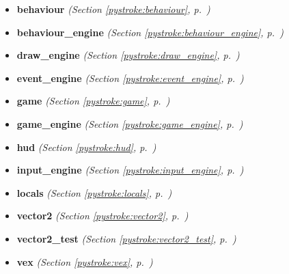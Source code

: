 \begin{itemize}
\setlength{\parskip}{0ex}
\item \textbf{behaviour}
  \textit{(Section \ref{pystroke:behaviour}, p.~\pageref{pystroke:behaviour})}

\item \textbf{behaviour\_engine}
  \textit{(Section \ref{pystroke:behaviour_engine}, p.~\pageref{pystroke:behaviour_engine})}

\item \textbf{draw\_engine}
  \textit{(Section \ref{pystroke:draw_engine}, p.~\pageref{pystroke:draw_engine})}

\item \textbf{event\_engine}
  \textit{(Section \ref{pystroke:event_engine}, p.~\pageref{pystroke:event_engine})}

\item \textbf{game}
  \textit{(Section \ref{pystroke:game}, p.~\pageref{pystroke:game})}

\item \textbf{game\_engine}
  \textit{(Section \ref{pystroke:game_engine}, p.~\pageref{pystroke:game_engine})}

\item \textbf{hud}
  \textit{(Section \ref{pystroke:hud}, p.~\pageref{pystroke:hud})}

\item \textbf{input\_engine}
  \textit{(Section \ref{pystroke:input_engine}, p.~\pageref{pystroke:input_engine})}

\item \textbf{locals}
  \textit{(Section \ref{pystroke:locals}, p.~\pageref{pystroke:locals})}

\item \textbf{vector2}
  \textit{(Section \ref{pystroke:vector2}, p.~\pageref{pystroke:vector2})}

\item \textbf{vector2\_test}
  \textit{(Section \ref{pystroke:vector2_test}, p.~\pageref{pystroke:vector2_test})}

\item \textbf{vex}
  \textit{(Section \ref{pystroke:vex}, p.~\pageref{pystroke:vex})}

\end{itemize}



